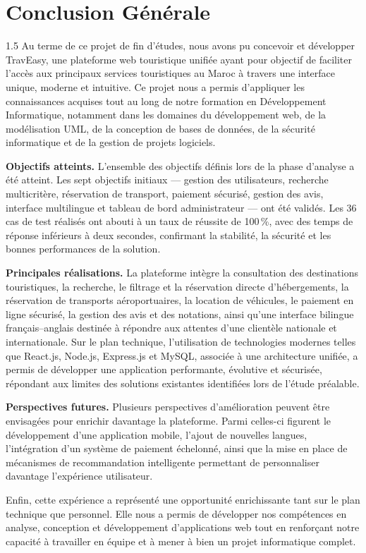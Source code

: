 \documentclass[a4paper,12pt]{report}
\begin{document}
\section*{Conclusion Générale}
\vspace{0.5cm}
\begin{spacing}{1.5}
\justifying
Au terme de ce projet de fin d'études, nous avons pu concevoir et développer TravEasy, une plateforme web touristique unifiée ayant pour objectif de faciliter l'accès aux principaux services touristiques au Maroc à travers une interface unique, moderne et intuitive. Ce projet nous a permis d'appliquer les connaissances acquises tout au long de notre formation en Développement Informatique, notamment dans les domaines du développement web, de la modélisation UML, de la conception de bases de données, de la sécurité informatique et de la gestion de projets logiciels.

\textbf{Objectifs atteints.} L'ensemble des objectifs définis lors de la phase d'analyse a été atteint. Les sept objectifs initiaux --- gestion des utilisateurs, recherche multicritère, réservation de transport, paiement sécurisé, gestion des avis, interface multilingue et tableau de bord administrateur --- ont été validés. Les 36 cas de test réalisés ont abouti à un taux de réussite de 100\,\%, avec des temps de réponse inférieurs à deux secondes, confirmant la stabilité, la sécurité et les bonnes performances de la solution.

\textbf{Principales réalisations.} La plateforme intègre la consultation des destinations touristiques, la recherche, le filtrage et la réservation directe d'hébergements, la réservation de transports aéroportuaires, la location de véhicules, le paiement en ligne sécurisé, la gestion des avis et des notations, ainsi qu'une interface bilingue français–anglais destinée à répondre aux attentes d'une clientèle nationale et internationale. Sur le plan technique, l'utilisation de technologies modernes telles que React.js, Node.js, Express.js et MySQL, associée à une architecture unifiée, a permis de développer une application performante, évolutive et sécurisée, répondant aux limites des solutions existantes identifiées lors de l'étude préalable.

\textbf{Perspectives futures.} Plusieurs perspectives d'amélioration peuvent être envisagées pour enrichir davantage la plateforme. Parmi celles-ci figurent le développement d'une application mobile, l'ajout de nouvelles langues, l'intégration d'un système de paiement échelonné, ainsi que la mise en place de mécanismes de recommandation intelligente permettant de personnaliser davantage l'expérience utilisateur.

Enfin, cette expérience a représenté une opportunité enrichissante tant sur le plan technique que personnel. Elle nous a permis de développer nos compétences en analyse, conception et développement d'applications web tout en renforçant notre capacité à travailler en équipe et à mener à bien un projet informatique complet.

\end{spacing}

\nocite{*}


\end{document}
